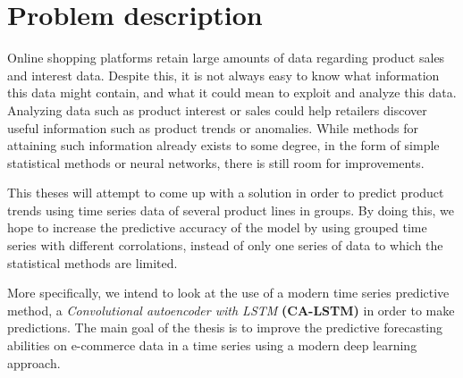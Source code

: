 
\section{Problem description} \label{into:problem-description}
Online shopping platforms retain large amounts of data regarding product sales and interest data.
Despite this, it is not always easy to know what information this data might contain, and what it could mean to exploit and analyze this data.
Analyzing data such as product interest or sales could help retailers discover useful information such as product trends or anomalies.
While methods for attaining such information already exists to some degree, in the form of simple statistical methods or neural networks,
there is still room for improvements.


This theses will attempt to come up with a solution in order to predict product trends using time series data of several product lines in groups.
By doing this, we hope to increase the predictive accuracy of the model by using grouped time series with different corrolations,
instead of only one series of data to which the statistical methods are limited.

More specifically, we intend to look at the use of a modern time series predictive method, a \textit{Convolutional autoencoder with LSTM} \textbf{(CA-LSTM)} in order to make predictions.
The main goal of the thesis is to improve the predictive forecasting abilities on e-commerce data in a time series using a modern deep learning approach.
